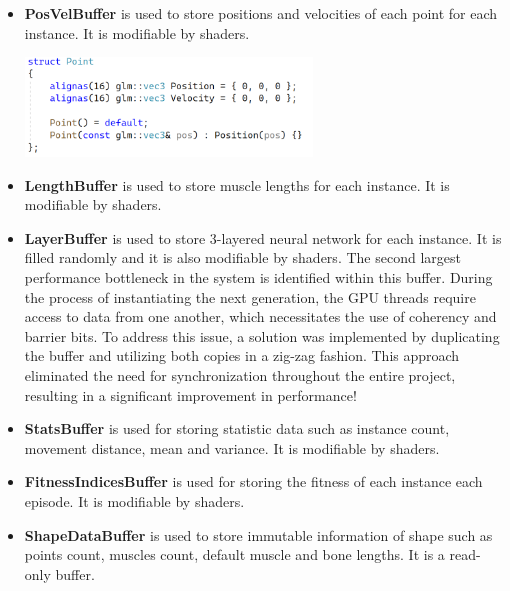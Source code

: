         \begin{itemize}
            
            \item{\textbf{PosVelBuffer}}
                is used to store positions and velocities of each point for each instance.
                It is modifiable by shaders.

                \includegraphics[width=3in]{resources/Point.png}

            \item{\textbf{LengthBuffer}}
                is used to store muscle lengths for each instance.
                It is modifiable by shaders.

            \item{\textbf{LayerBuffer}}
                is used to store 3-layered neural network for each instance. It is filled randomly and it is also modifiable by shaders. The second largest performance bottleneck in the system is identified within this buffer. During the process of instantiating the next generation, the GPU threads require access to data from one another, which necessitates the use of coherency and barrier bits. To address this issue, a solution was implemented by duplicating the buffer and utilizing both copies in a zig-zag fashion. This approach eliminated the need for synchronization throughout the entire project, resulting in a significant improvement in performance!

            \item{\textbf{StatsBuffer}}
                is used for storing statistic data such as instance count, movement distance, mean and variance.
                It is modifiable by shaders.

            \item{\textbf{FitnessIndicesBuffer}}
                is used for storing the fitness of each instance each episode.
                It is modifiable by shaders.

                \item{\textbf{ShapeDataBuffer}}
                is used to store immutable information of shape such as points count, muscles count, default muscle and bone lengths.
                It is a read-only buffer.


\end{itemize}
